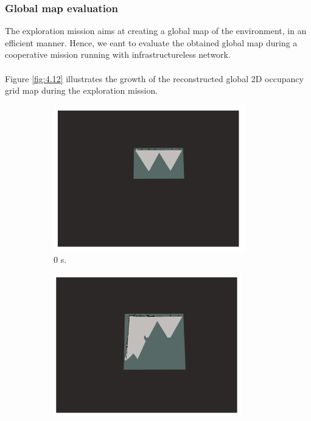 \documentclass[11pt,openany]{book}
\begin{document}
\begin{algorimth}[H]
\subsubsection{Global map evaluation}
The exploration mission aims at creating a global map of the environment, in an efficient manner. Hence, we eant to evaluate the obtained global map during a cooperative mission running with infrastructureless network.\\\\
Figure \ref{fig:4.12} illustrates the growth of the reconstructed global 2D occupancy grid map during the exploration mission.
\begin{figure}[H]
    \centering
    \begin{subfigure}[H]{0.3\linewidth}
        \includegraphics[width=\linewidth]{assets/4_12_a.png}
        \caption{{0 s.}}
        \label{fig:4.12a}
    \end{subfigure}
    \begin{subfigure}[H]{0.3\linewidth}
        \includegraphics[width=\linewidth]{assets/4_12_b.png}

\end{subfigure}
\end{figure}
\end{algorimth}
\end{document}
